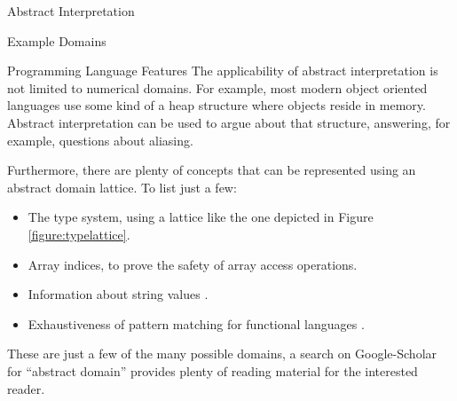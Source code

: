 \begin{chapter}{Abstract Interpretation}
\begin{section}{Example Domains}
		\begin{subsection}{Programming Language Features}
			The applicability of abstract interpretation is not limited to numerical domains. For example, most modern object oriented languages use some kind of a heap structure where objects reside in memory. Abstract interpretation can be used to argue about that structure, answering, for example, questions about aliasing.

			Furthermore, there are plenty of concepts that can be represented using an abstract domain lattice. To list just a few:
			\begin{itemize}
				\item The type system, using a lattice like the one depicted in Figure \ref{figure:typelattice}.
				\item Array indices, to prove the safety of array access operations.
				\item Information about string values \cite{costantini:ferrara:cortesi11}.
				\item Exhaustiveness of pattern matching for functional languages \cite{ferrara10}.
			\end{itemize}
		\end{subsection}

		These are just a few of the many possible domains, a search on Google-Scholar for ``abstract domain'' provides plenty of reading material for the interested reader.
	\end{section}
\end{chapter}

